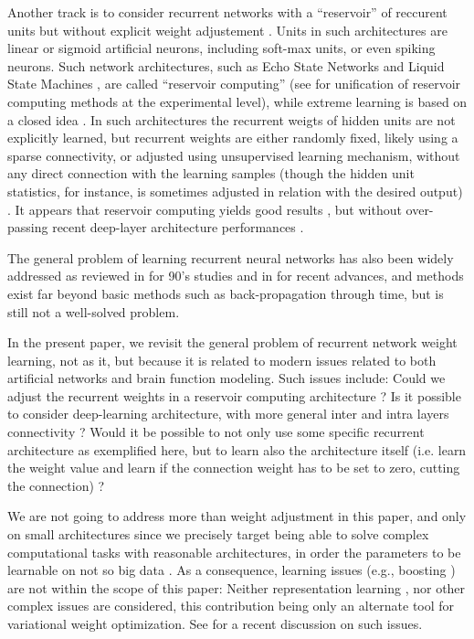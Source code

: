 Another track is to consider recurrent networks with a ``reservoir''
of reccurent units but without explicit weight adjustement
\cite{verstraeten-etal:07}. Units in such architectures are linear or
sigmoid artificial neurons, including soft-max units, or even spiking
neurons. Such network architectures, such as Echo State Networks
\cite{jaeger:03} and Liquid State Machines \cite{maass-etal:02}, are
called ``reservoir computing'' (see \cite{verstraeten-etal:07} for
unification of reservoir computing methods at the experimental level),
while extreme learning is based on a closed idea \cite{HUANG2006489}.
In such architectures the recurrent weigts of hidden units are not
explicitly learned, but recurrent weights are either randomly fixed,
likely using a sparse connectivity, or adjusted using unsupervised
learning mechanism, without any direct connection with the learning
samples (though the hidden unit statistics, for instance, is sometimes
adjusted in relation with the desired output)
\cite{paugam-moisy-etal:08}. It appears that reservoir
computing yields good results \cite{verstraeten-etal:07}, but without
over-passing recent deep-layer architecture performances
\cite{Deng:2014}.

The general problem of learning recurrent neural networks has also
been widely addressed as reviewed in \cite{cun_theoretical_1988} for
90's studies and in \cite{martens_learning_2016} for recent advances,
and methods exist far beyond basic methods such as back-propagation
through time, but is still not a well-solved problem.

In the present paper, we revisit the general problem of recurrent
network weight learning, not as it, but because it is related to
modern issues related to both artificial networks and brain function
modeling. Such issues include: Could we adjust the
recurrent weights in a reservoir computing architecture ?  Is it
possible to consider deep-learning architecture, with more general
inter and intra layers connectivity ? Would it be possible to not only
use some specific recurrent architecture as exemplified here, but to
learn also the architecture itself (i.e. learn the weight value and
learn if the connection weight has to be set to zero, cutting the
connection) ?

We are not going to address more than weight adjustment in this paper,
and only on small architectures since we precisely target being able
to solve complex computational tasks with reasonable architectures,
in order the parameters to be learnable on not so big data
\cite{Fdrumond2017}. As a consequence, learning issues (e.g., boosting
\cite{Freund2003Efficient}) are not within the scope of this paper:
Neither representation learning \cite{Bengio2012Representation}, nor other
complex issues \cite{Goodfellow2016Deep} are considered, this
contribution being only an alternate tool for variational weight
optimization. See \cite{Fdrumond2017} for a recent discussion on 
such issues.

